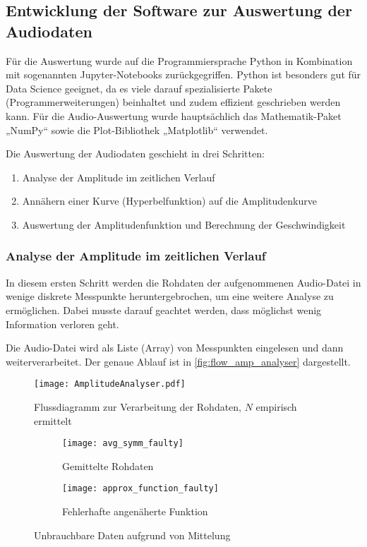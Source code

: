 \subsection{Entwicklung der Software zur Auswertung der Audiodaten}
\label{section:EntwicklungSoftware}

Für die Auswertung wurde auf die Programmiersprache Python \cite{Python} in Kombination mit sogenannten Jupyter-Notebooks \cite{ProjectJupyter} zurückgegriffen. Python ist besonders gut für Data Science geeignet, da es viele darauf spezialisierte Pakete (Programmerweiterungen) beinhaltet und zudem effizient geschrieben werden kann. Für die Audio-Auswertung wurde hauptsächlich das Mathematik-Paket „NumPy“ \cite{NumPy} sowie die Plot-Bibliothek „Matplotlib“ \cite{Matplotlib} verwendet.

Die Auswertung der Audiodaten geschieht in drei Schritten:
\begin{enumerate}
    \item Analyse der Amplitude im zeitlichen Verlauf
    \item Annähern einer Kurve (Hyperbelfunktion) auf die Amplitudenkurve
    \item Auswertung der Amplitudenfunktion und Berechnung der Geschwindigkeit
\end{enumerate}

\subsubsection{Analyse der Amplitude im zeitlichen Verlauf}
\label{section:AnalyseAmplitude}
In diesem ersten Schritt werden die Rohdaten der aufgenommenen Audio-Datei in wenige diskrete Messpunkte heruntergebrochen, um eine weitere Analyse zu ermöglichen. Dabei musste darauf geachtet werden, dass möglichst wenig Information verloren geht.

Die Audio-Datei wird als Liste (Array) von Messpunkten eingelesen und dann weiterverarbeitet. Der genaue Ablauf ist in \autoref{fig:flow_amp_analyser} dargestellt.

\begin{figure}[h]
    \centering
    \texttt{[image: AmplitudeAnalyser.pdf]}
    \caption{Flussdiagramm zur Verarbeitung der Rohdaten, \(N\) empirisch ermittelt}
    \label{fig:flow_amp_analyser}
\end{figure}

\begin{figure}[h!]
    \begin{subfigure}{.45\textwidth}
        \centering
        \texttt{[image: avg\_symm\_faulty]}
        \caption{Gemittelte Rohdaten}
        \label{img:avg_symm_faulty}
    \end{subfigure}
    \begin{subfigure}{.45\linewidth}
        \centering
        \texttt{[image: approx\_function\_faulty]}
        \caption{Fehlerhafte angenäherte Funktion}
        \label{img:approx_function_faulty}
    \end{subfigure}
    \caption{Unbrauchbare Daten aufgrund von Mittelung}
    \label{img:faulty_averaging}
\end{figure}

